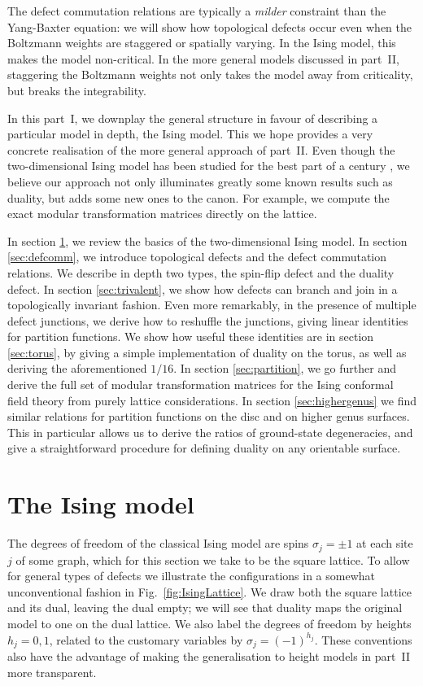 \documentclass[11pt]{article}
\numberwithin{equation}{section}		%
\begin{document}
The defect commutation relations are typically a {\em milder} constraint than the Yang-Baxter equation: we will show how topological defects occur even when the Boltzmann weights are staggered or spatially varying. In the Ising model, this makes the model non-critical. In the more general models discussed in part~II, staggering the Boltzmann weights not only takes the model away from criticality, but breaks the integrability.


In this part~I, we downplay the general structure in favour of describing a particular model in depth, the Ising model. This we hope provides a very concrete realisation of the more general approach of part~II.  
Even though the two-dimensional Ising model has been studied for the best part of a century \cite{mccoywubook}, we believe our approach not only illuminates greatly some known results such as duality, but adds some new ones to the canon. For example, we compute the exact modular transformation matrices directly on the lattice. 

In section \ref{sec:Ising}, we review the basics of the two-dimensional Ising model. In section \ref{sec:defcomm}, we introduce topological defects and the defect commutation relations. We describe in depth two types, the spin-flip defect and the duality defect. In section \ref{sec:trivalent}, we show how defects can branch and join in a topologically invariant fashion. Even more remarkably, in the presence of multiple defect junctions,  we derive how to reshuffle the junctions, giving linear identities for partition functions. We  show how useful these identities are in section \ref{sec:torus}, by giving a simple implementation of duality on the torus, as well as deriving the aforementioned $1/16$. In section \ref{sec:partition}, we go further and derive the full set of modular transformation matrices for the Ising conformal field theory from purely lattice considerations. In section \ref{sec:highergenus} we find similar relations for partition functions on the disc and on higher genus surfaces. This in particular allows us to derive the ratios of ground-state degeneracies, and give a straightforward procedure for defining duality on any orientable surface.

\section{The Ising model}
\label{sec:Ising}




The degrees of freedom of the classical Ising model are spins $\sigma_j=\pm 1$ at each site $j$ of some graph, which for this section we take to be the square lattice.
To allow for general types of defects  we illustrate the configurations in a somewhat unconventional fashion in Fig.~\ref{fig:IsingLattice}. 
We draw both the square lattice and its dual, leaving the dual empty; we will see that duality maps the original model to one on the dual lattice. We also label the degrees of freedom by heights $h_j=0,1$, related to the customary variables by $\sigma_j = (-1)^{h_j}$. These conventions also have the advantage of making the generalisation to height models in part~II more transparent.
\end{document}
